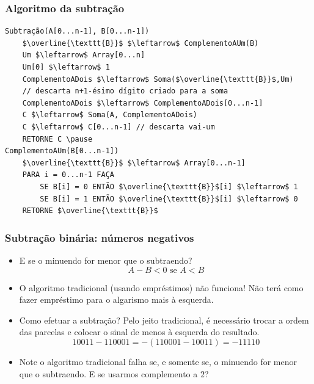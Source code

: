 \documentclass{beamer}
\begin{document}
\begin{frame}[fragile]
\frametitle{Algoritmo da subtração}

\begin{Verbatim}[commandchars=\\\{\},codes={\catcode`$=3\catcode`^=7}]
Subtração(A[0...n-1], B[0...n-1])
    $\overline{\texttt{B}}$ $\leftarrow$ ComplementoAUm(B)
    Um $\leftarrow$ Array[0...n]
    Um[0] $\leftarrow$ 1
    ComplementoADois $\leftarrow$ Soma($\overline{\texttt{B}}$,Um)
    // descarta n+1-ésimo dígito criado para a soma
    ComplementoADois $\leftarrow$ ComplementoADois[0...n-1]
    C $\leftarrow$ Soma(A, ComplementoADois)
    C $\leftarrow$ C[0...n-1] // descarta vai-um
    RETORNE C \pause
ComplementoAUm(B[0...n-1])
    $\overline{\texttt{B}}$ $\leftarrow$ Array[0...n-1]
    PARA i = 0...n-1 FAÇA
        SE B[i] = 0 ENTÃO $\overline{\texttt{B}}$[i] $\leftarrow$ 1
        SE B[i] = 1 ENTÃO $\overline{\texttt{B}}$[i] $\leftarrow$ 0
    RETORNE $\overline{\texttt{B}}$
\end{Verbatim}

\end{frame}


\begin{frame}
\frametitle{Subtração binária: números negativos}

\begin{itemize}
\item E se o minuendo for menor que o subtraendo? $$A - B < 0 \text{ se } A < B$$
\vspace{-12pt}
\pause
\item O algoritmo tradicional (usando empréstimos) não funciona! Não terá como fazer empréstimo para o algarismo mais à esquerda.
\pause
\item Como efetuar a subtração? Pelo jeito tradicional, é necessário trocar a ordem das parcelas e colocar o sinal de menos à esquerda do resultado.
$$10011 - 110001 = -(110001-10011) = -11110$$ 
\vspace{-12pt}
\pause
\item Note o algoritmo tradicional falha se, e somente se, o minuendo for menor que o subtraendo. E se usarmos complemento a $2$?
\end{itemize}

\end{frame}
\end{document}
